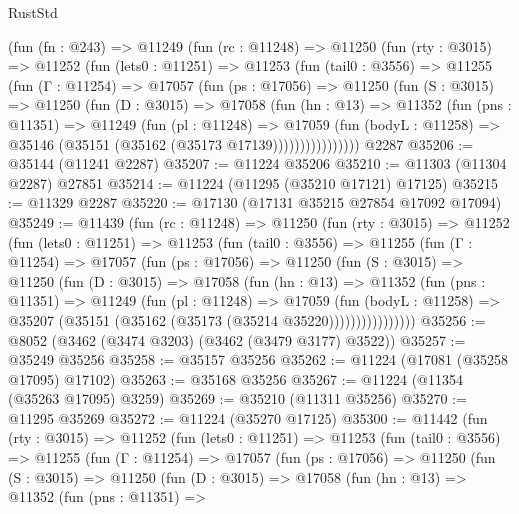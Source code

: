 \begin{lexlean}{RustStd}
\begin{coremodule}
    (fun (fn : @243) =>
    @11249
      (fun (rc : @11248) =>
      @11250
        (fun (rty : @3015) =>
        @11252
          (fun (lets0 : @11251) =>
          @11253
            (fun (tail0 : @3556) =>
            @11255
              (fun (Γ : @11254) =>
              @17057
                (fun (ps : @17056) =>
                @11250
                  (fun (S : @3015) =>
                  @11250
                    (fun (D : @3015) =>
                    @17058
                      (fun (hn : @13) =>
                      @11352
                        (fun (pns : @11351) =>
                        @11249
                          (fun (pl : @11248) =>
                          @17059
                            (fun (bodyL : @11258) =>
                            @35146 (@35151 (@35162 (@35173 @17139))))))))))))))))
    @2287
@35206 := @35144 (@11241 @2287)
@35207 := @11224 @35206
@35210 := @11303 (@11304 @2287) @27851
@35214 := @11224 (@11295 (@35210 @17121) @17125)
@35215 := @11329 @2287
@35220 := @17130 (@17131 @35215 @27854 @17092 @17094)
@35249 := @11439
    (fun (rc : @11248) =>
    @11250
      (fun (rty : @3015) =>
      @11252
        (fun (lets0 : @11251) =>
        @11253
          (fun (tail0 : @3556) =>
          @11255
            (fun (Γ : @11254) =>
            @17057
              (fun (ps : @17056) =>
              @11250
                (fun (S : @3015) =>
                @11250
                  (fun (D : @3015) =>
                  @17058
                    (fun (hn : @13) =>
                    @11352
                      (fun (pns : @11351) =>
                      @11249
                        (fun (pl : @11248) =>
                        @17059
                          (fun (bodyL : @11258) =>
                          @35207 (@35151 (@35162 (@35173 (@35214 @35220))))))))))))))))
@35256 := @8052 (@3462 (@3474 @3203) (@3462 (@3479 @3177) @3522))
@35257 := @35249 @35256
@35258 := @35157 @35256
@35262 := @11224 (@17081 (@35258 @17095) @17102)
@35263 := @35168 @35256
@35267 := @11224 (@11354 (@35263 @17095) @3259)
@35269 := @35210 (@11311 @35256)
@35270 := @11295 @35269
@35272 := @11224 (@35270 @17125)
@35300 := @11442
    (fun (rty : @3015) =>
    @11252
      (fun (lets0 : @11251) =>
      @11253
        (fun (tail0 : @3556) =>
        @11255
          (fun (Γ : @11254) =>
          @17057
            (fun (ps : @17056) =>
            @11250
              (fun (S : @3015) =>
              @11250
                (fun (D : @3015) =>
                @17058
                  (fun (hn : @13) =>
                  @11352
                    (fun (pns : @11351) =>

\end{coremodule}
\end{lexlean}
